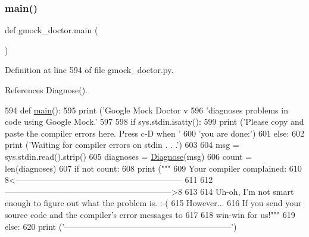 \subsubsection{\texorpdfstring{main()}{main()}}
{\footnotesize\ttfamily def gmock\+\_\+doctor.\+main (\begin{DoxyParamCaption}{ }\end{DoxyParamCaption})}



Definition at line 594 of file gmock\+\_\+doctor.\+py.



References Diagnose().


\begin{DoxyCode}
594 \textcolor{keyword}{def }\hyperlink{namespacegmock__doctor_a6eb6c47cf5a3a7c4266f473c0af6b82f}{main}():
595   \textcolor{keywordflow}{print} (\textcolor{stringliteral}{'Google Mock Doctor v%
596          \textcolor{stringliteral}{'diagnoses problems in code using Google Mock.'} %
597 
598   \textcolor{keywordflow}{if} sys.stdin.isatty():
599     \textcolor{keywordflow}{print} (\textcolor{stringliteral}{'Please copy and paste the compiler errors here.  Press c-D when '}
600            \textcolor{stringliteral}{'you are done:'})
601   \textcolor{keywordflow}{else}:
602     \textcolor{keywordflow}{print} (\textcolor{stringliteral}{'Waiting for compiler errors on stdin . . .'})
603 
604   msg = sys.stdin.read().strip()
605   diagnoses = \hyperlink{namespacegmock__doctor_a8b791ed6679a0135862ebb3e8c27b2b4}{Diagnose}(msg)
606   count = len(diagnoses)
607   \textcolor{keywordflow}{if} \textcolor{keywordflow}{not} count:
608     \textcolor{keywordflow}{print} (\textcolor{stringliteral}{"""}
609 \textcolor{stringliteral}{Your compiler complained:}
610 \textcolor{stringliteral}{8<------------------------------------------------------------}
611 \textcolor{stringliteral}{%
612 \textcolor{stringliteral}{------------------------------------------------------------>8}
613 \textcolor{stringliteral}{}
614 \textcolor{stringliteral}{Uh-oh, I'm not smart enough to figure out what the problem is. :-(}
615 \textcolor{stringliteral}{However...}
616 \textcolor{stringliteral}{If you send your source code and the compiler's error messages to}
617 \textcolor{stringliteral}{%
618 \textcolor{stringliteral}{win-win for us!"""} %
619   \textcolor{keywordflow}{else}:
620     \textcolor{keywordflow}{print} (\textcolor{stringliteral}{'------------------------------------------------------------'})
}}}
\end{DoxyCode}
